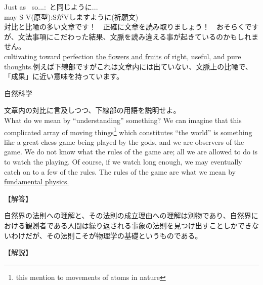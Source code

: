 \documentclass[b4paper,fleqn,dvipdfmx]{jsarticle}
\begin{document}
Just as~ so...:~と同じように...\\
may S V(原型):SがVしますように(祈願文)\\
対比と比喩の多い文章です！　正確に文章を読み取りましょう！　おそらくですが、文法事項にこだわった結果、文脈を読み違える事が起きているのかもしれません。\\
cultivating toward perfection \underline{the flowers and fruits} of right, useful, and pure thoughts.例えば下線部ですがこれは文章内には出ていない、文脈上の比喩で、「成果」に近い意味を持っています。



\newpage


\begin{itembox}[l]{自然科学}

    文章内の対比に言及しつつ、下線部の用語を説明せよ。\\
    What do we mean by “understanding” something? We can imagine that this complicated array of moving things\footnote{this mention to movements of atoms in nature} which constitutes “the world” is something like a great chess game being played by the gods, and we are observers of the game. We do not know what the rules of the game are; all we are allowed to do is to watch the playing. Of course, if we watch long enough, we may eventually catch on to a few of the rules. The rules of the game are what we mean by \underline{fundamental physics.}
    
\end{itembox}


\begin{flushleft}
【解答】
\end{flushleft}

自然界の法則への理解と、その法則の成立理由への理解は別物であり、自然界における観測者である人間は繰り返される事象の法則を見つけ出すことしかできないわけだが、その法則こそが物理学の基礎というものである。

\begin{flushleft}
【解説】
\end{flushleft}





\newpage
\end{document}
